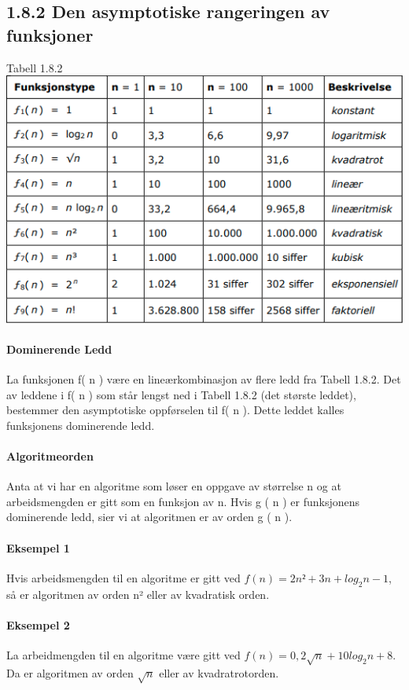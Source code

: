 \documentclass[11pt]{article}
\begin{document}
    \subsection{1.8.2 Den asymptotiske rangeringen av funksjoner}
        Tabell 1.8.2
        \includegraphics{Tabell-1.8.2.png}

        \paragraph{Dominerende Ledd}
        La funksjonen f( n ) være en lineærkombinasjon av flere
        ledd fra Tabell 1.8.2. Det av leddene i f( n ) som står lengst ned i Tabell 1.8.2
        (det største leddet), bestemmer den asymptotiske oppførselen til f( n ). Dette
        leddet kalles funksjonens dominerende ledd.

        \paragraph{Algoritmeorden}
        Anta at vi har en algoritme som løser en oppgave av
        størrelse n og at arbeidsmengden er gitt som en funksjon av n. Hvis g ( n ) er
        funksjonens dominerende ledd, sier vi at algoritmen er av orden g ( n ).

        \paragraph{Eksempel 1}
        Hvis arbeidsmengden til en algoritme er gitt ved $f( n ) = 2 n² + 3 n + log_2 n - 1$,
        så er algoritmen av orden n² eller av kvadratisk orden.
        \paragraph{Eksempel 2}
        La arbeidmengden til en algoritme være gitt ved $f( n ) = 0,2 \sqrt{n} + 10 log_2 n + 8$.
        Da er algoritmen av orden $\sqrt{n}$ eller av kvadratrotorden.
\end{document}

